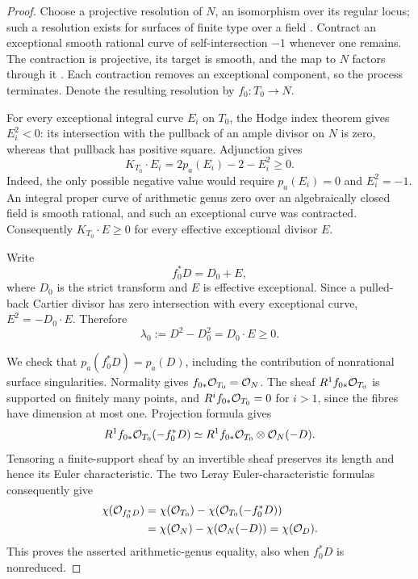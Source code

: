 \begin{proof}
Choose a projective resolution of $N$, an isomorphism over its
regular locus; such a resolution exists for surfaces of finite type
over a field \cite[Tag~0BGP]{Stacks}. Contract an exceptional smooth
rational curve of self-intersection $-1$ whenever one remains.
The contraction is projective, its target is smooth, and the map to
$N$ factors through it
\cite[Tags~0C5J, 0C2M and~0C2N]{Stacks}.
Each contraction removes an exceptional component, so the process
terminates. Denote the resulting resolution by $f_0:T_0\to N$.

For every exceptional integral curve $E_i$ on $T_0$, the Hodge index
theorem gives $E_i^2<0$: its intersection with the pullback of an
ample divisor on $N$ is zero, whereas that pullback has positive
square. Adjunction gives
\[
 K_{T_0}\cdot E_i=2p_a(E_i)-2-E_i^2\geq0.
\]
Indeed, the only possible negative value would require
$p_a(E_i)=0$ and $E_i^2=-1$. An integral proper curve of arithmetic
genus zero over an algebraically closed field is smooth rational,
and such an exceptional curve was contracted. Consequently
$K_{T_0}\cdot E\geq0$ for every effective exceptional divisor $E$.

Write
\[
 f_0^*D=D_0+E,
\]
where $D_0$ is the strict transform and $E$ is effective exceptional.
Since a pulled-back Cartier divisor has zero intersection with every
exceptional curve, $E^2=-D_0\cdot E$. Therefore
\begin{equation}\label{eq:positive-square-minimal-loss}
 \lambda_0:=D^2-D_0^2=D_0\cdot E\geq0.
\end{equation}

We check that $p_a(f_0^*D)=p_a(D)$, including the contribution of
nonrational surface singularities. Normality gives
$f_{0*}\mathcal O_{T_0}=\mathcal O_N$. The sheaf
$R^1f_{0*}\mathcal O_{T_0}$ is supported on finitely many points, and
$R^if_{0*}\mathcal O_{T_0}=0$ for $i>1$, since the fibres have dimension
at most one. Projection formula gives
\[
 R^1f_{0*}\mathcal O_{T_0}(-f_0^*D)
   \simeq R^1f_{0*}\mathcal O_{T_0}\otimes\mathcal O_N(-D).
\]
Tensoring a finite-support sheaf by an invertible sheaf preserves
its length and hence its Euler characteristic. The two Leray
Euler-characteristic formulas consequently give
\begin{align*}
 \chi(\mathcal O_{f_0^*D})
 &=\chi(\mathcal O_{T_0})-\chi(\mathcal O_{T_0}(-f_0^*D))\\
 &=\chi(\mathcal O_N)-\chi(\mathcal O_N(-D))
 =\chi(\mathcal O_D).
\end{align*}
This proves the asserted arithmetic-genus equality, also when
$f_0^*D$ is nonreduced.


\end{proof}
